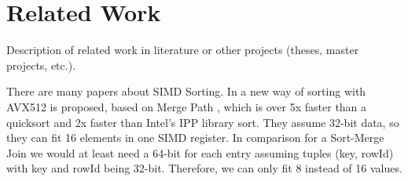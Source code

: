 \section{Related Work}
\label{sec:related-work}

Description of related work in literature or other projects (theses, master projects, etc.).
\cite{MPSM}
\cite{Balkesen}
\cite{10.14778/1687553.1687564}
\cite{10.14778/1454159.1454171}

There are many papers about SIMD Sorting.
In \cite{Watkins} a new way of sorting with AVX512 is proposed, based on Merge Path \cite{MergePath}, which
is over 5x faster than a quicksort and 2x faster than Intel's IPP library sort. They assume 32-bit data, so they can
fit 16 elements in one SIMD register. In comparison for a Sort-Merge Join we would at least need a 64-bit for each
entry assuming tuples (key, rowId) with key and rowId being 32-bit. Therefore, we can only fit 8 instead of 16 values.  
